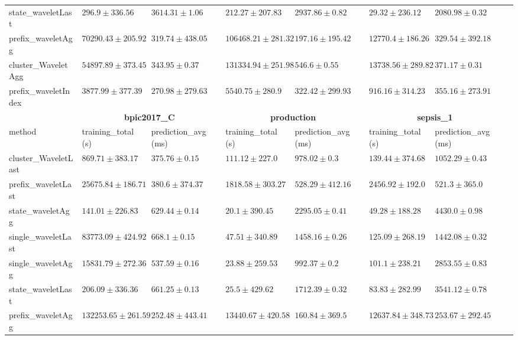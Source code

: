 \documentclass[twoside,11pt]{Latex/Classes/PhDthesisPSnPDF}
\begin{document}
\begin{table}[h]
{\begin{tabular}{llllllll}
	state\_waveletLast & $296.9 \pm 336.56$ & $3614.31 \pm 1.06$ & $212.27 \pm 207.83$ & $2937.86 \pm 0.82$ & $29.32 \pm 236.12$ & $2080.98 \pm 0.32$ \\ 
	prefix\_waveletAgg & $70290.43 \pm 205.92$ & $319.74 \pm 438.05$ & $106468.21 \pm 281.32$ & $\mathbf{197.16 \pm 195.42}$ & $12770.4 \pm 186.26$ & $\mathbf{329.54 \pm 392.18}$ \\ 
	cluster\_WaveletAgg & $54897.89 \pm 373.45$ & $343.95 \pm 0.37$ & $131334.94 \pm 251.98$ & $546.6 \pm 0.55$ & $13738.56 \pm 289.82$ & $371.17 \pm 0.31$ \\ 
	prefix\_waveletIndex & $3877.99 \pm 377.39$ & $\mathbf{270.98 \pm 279.63}$ & $5540.75 \pm 280.9$ & $322.42 \pm 299.93$ & $916.16 \pm 314.23$ & $355.16 \pm 273.91$ \\ 
	\bottomrule
	\toprule
	& \multicolumn{2}{c}{{\bfseries bpic2017\_C}} & \multicolumn{2}{c}{{\bfseries production}} & \multicolumn{2}{c}{{\bfseries sepsis\_1}} \\ \cmidrule(lr){2-3} \cmidrule(lr){4-5} \cmidrule(lr){6-7}
	method  & training\_total (s) & prediction\_avg (ms) & training\_total (s) & prediction\_avg (ms) & training\_total (s) & prediction\_avg (ms) \\ \midrule
	cluster\_WaveletLast & $869.71 \pm 383.17$ & $375.76 \pm 0.15$ & $111.12 \pm 227.0$ & $978.02 \pm 0.3$ & $139.44 \pm 374.68$ & $1052.29 \pm 0.43$ \\ 
	prefix\_waveletLast & $25675.84 \pm 186.71$ & $380.6 \pm 374.37$ & $1818.58 \pm 303.27$ & $528.29 \pm 412.16$ & $2456.92 \pm 192.0$ & $521.3 \pm 365.0$ \\ 
	state\_waveletAgg & $\mathbf{141.01 \pm 226.83}$ & $629.44 \pm 0.14$ & $\mathbf{20.1 \pm 390.45}$ & $2295.05 \pm 0.41$ & $\mathbf{49.28 \pm 188.28}$ & $4430.0 \pm 0.98$ \\ 
	single\_waveletLast & $83773.09 \pm 424.92$ & $668.1 \pm 0.15$ & $47.51 \pm 340.89$ & $1458.16 \pm 0.26$ & $125.09 \pm 268.19$ & $1442.08 \pm 0.32$ \\ 
	single\_waveletAgg & $15831.79 \pm 272.36$ & $537.59 \pm 0.16$ & $23.88 \pm 259.53$ & $992.37 \pm 0.2$ & $101.1 \pm 238.21$ & $2853.55 \pm 0.83$ \\ 
	state\_waveletLast & $206.09 \pm 336.36$ & $661.25 \pm 0.13$ & $25.5 \pm 429.62$ & $1712.39 \pm 0.32$ & $83.83 \pm 282.99$ & $3541.12 \pm 0.78$ \\ 
	prefix\_waveletAgg & $132253.65 \pm 261.59$ & $252.48 \pm 443.41$ & $13440.67 \pm 420.58$ & $\mathbf{160.84 \pm 369.5}$ & $12637.84 \pm 348.73$ & $253.67 \pm 292.45$ \\ 

\end{tabular}}
\end{table}
\end{document}
